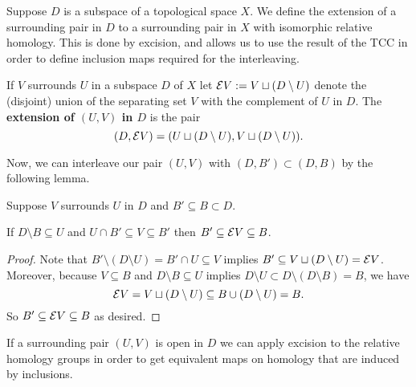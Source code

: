 
Suppose $D$ is a subspace of a topological space $X$.
We define the extension of a surrounding pair in $D$ to a surrounding pair in $X$ with isomorphic relative homology.
This is done by excision, and allows us to use the result of the TCC in order to define inclusion maps required for the interleaving.

\begin{definition}[Extension]
  If $V$ surrounds $U$ in a subspace $D$ of $X$ let $\mathcal{E} V := V\sqcup (D\setminus U)$ denote the (disjoint) union of the separating set $V$ with the complement of $U$ in $D$.
  The \textbf{extension of $(U, V)$ in $D$} is the pair
  \[ (D, \mathcal{E} V) = (U\sqcup (D\setminus U), V\sqcup (D\setminus U)).\]
\end{definition}

Now, we can interleave our pair $(U, V)$ with $(D, B')\subset (D, B)$ by the following lemma.

\begin{lemma}\label{lem:surround_and_cover}
  Suppose $V$ surrounds $U$ in $D$ and $B'\subseteq B\subset D$.

  If $D\setminus B\subseteq U$ and $U\cap B'\subseteq V\subseteq B'$ then $B'\subseteq \mathcal{E} V\subseteq B$.
\end{lemma}
\begin{proof}
  Note that $B'\setminus (D\setminus U) = B'\cap U\subseteq V$ implies $B'\subseteq V\sqcup(D\setminus U) = \mathcal{E} V$.
  Moreover, because $V\subseteq B$ and $D\setminus B\subseteq U$ implies $D\setminus U \subset D\setminus (D\setminus B) = B$, we have
  \[ \mathcal{E} V = V\sqcup (D\setminus U) \subseteq B\cup (D\setminus U) = B. \]
  So $B' \subseteq \mathcal{E} V\subseteq B$ as desired.
\end{proof}

If a surrounding pair $(U, V)$ is open in $D$ we can apply excision to the relative homology groups in order to get equivalent maps on homology that are induced by inclusions.

